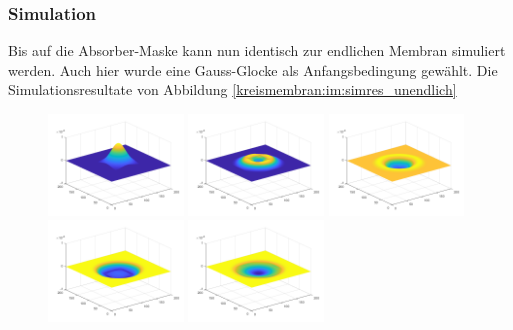 \subsubsection{Simulation}
Bis auf die Absorber-Maske kann nun identisch zur endlichen Membran
simuliert werden.
Auch hier wurde eine Gauss-Glocke als Anfangsbedingung gewählt. 
Die Simulationsresultate von Abbildung \ref{kreismembran:im:simres_unendlich}
\begin{figure}
	
	\begin{center}
		
		\includegraphics[width=0.32\textwidth]{papers/kreismembran/images/sim_2_1.png}
		\includegraphics[width=0.32\textwidth]{papers/kreismembran/images/sim_2_2.png}
		\includegraphics[width=0.32\textwidth]{papers/kreismembran/images/sim_2_3.png}
		\includegraphics[width=0.32\textwidth]{papers/kreismembran/images/sim_2_4.png}
		\includegraphics[width=0.32\textwidth]{papers/kreismembran/images/sim_2_5.png}

\end{center}
\end{figure}
